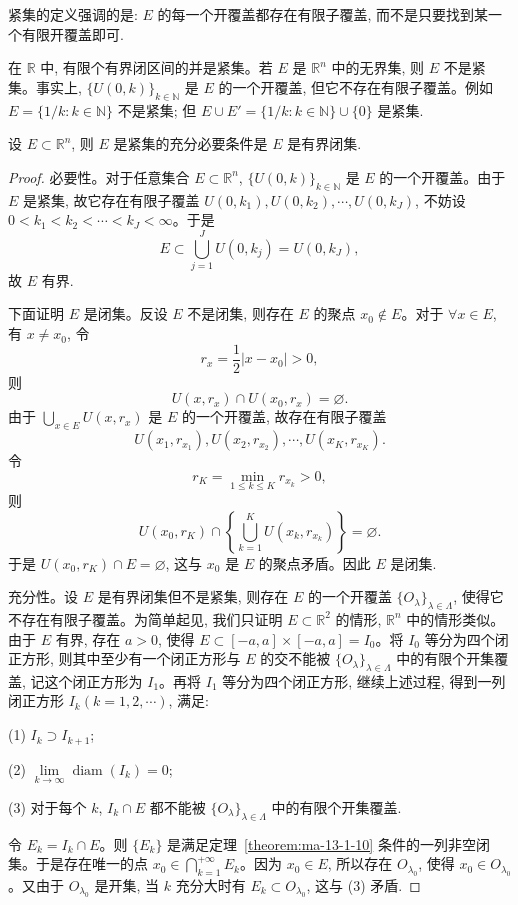 紧集的定义强调的是: $E$ 的每一个开覆盖都存在有限子覆盖, 而不是只要找到某一个有限开覆盖即可.

在 $\mathbb R$ 中, 有限个有界闭区间的并是紧集。若 $E$ 是 $\mathbb R^n$ 中的无界集, 则 $E$ 不是紧集。事实上, $\{U(0,k)\}_{k\in\mathbb N}$ 是 $E$ 的一个开覆盖, 但它不存在有限子覆盖。例如 $E=\{1/k:k\in\mathbb N\}$ 不是紧集; 但 $E\cup E'=\{1/k:k\in\mathbb N\}\cup\{0\}$ 是紧集.

\begin{theorem}\label{theorem:ma-13-1-13}
设 $E\subset\mathbb R^n$, 则 $E$ 是紧集的充分必要条件是 $E$ 是有界闭集.
\end{theorem}


\begin{proof}
必要性。对于任意集合 $E\subset\mathbb R^n$, $\{U(0,k)\}_{k\in\mathbb N}$ 是 $E$ 的一个开覆盖。由于 $E$ 是紧集, 故它存在有限子覆盖 $U(0,k_1),U(0,k_2),\cdots,U(0,k_J)$, 不妨设 $0<k_1<k_2<\cdots<k_J<\infty$。于是
\[
  E\subset\bigcup_{j=1}^J U(0,k_j)=U(0,k_J),
\]
故 $E$ 有界.

下面证明 $E$ 是闭集。反设 $E$ 不是闭集, 则存在 $E$ 的聚点 $x_0\notin E$。对于 $\forall x\in E$, 有 $x\ne x_0$, 令
\[
  r_x=\frac12|x-x_0|>0,
\]
则
\[
  U(x,r_x)\cap U(x_0,r_x)=\varnothing.
\]
由于 $\bigcup\limits_{x\in E}U(x,r_x)$ 是 $E$ 的一个开覆盖, 故存在有限子覆盖
\[
  U(x_1,r_{x_1}),U(x_2,r_{x_2}),\cdots,U(x_K,r_{x_K}).
\]
令
\[
  r_K=\min_{1\leqslant k\leqslant K}r_{x_k}>0,
\]
则
\[
  U(x_0,r_K)\cap\left\{\bigcup_{k=1}^K U(x_k,r_{x_k})\right\}=\varnothing.
\]
于是 $U(x_0,r_K)\cap E=\varnothing$, 这与 $x_0$ 是 $E$ 的聚点矛盾。因此 $E$ 是闭集.

充分性。设 $E$ 是有界闭集但不是紧集, 则存在 $E$ 的一个开覆盖 $\{O_\lambda\}_{\lambda\in\Lambda}$, 使得它不存在有限子覆盖。为简单起见, 我们只证明 $E\subset\mathbb R^2$ 的情形, $\mathbb R^n$ 中的情形类似。由于 $E$ 有界, 存在 $a>0$, 使得 $E\subset[-a,a]\times[-a,a]=I_0$。将 $I_0$ 等分为四个闭正方形, 则其中至少有一个闭正方形与 $E$ 的交不能被 $\{O_\lambda\}_{\lambda\in\Lambda}$ 中的有限个开集覆盖, 记这个闭正方形为 $I_1$。再将 $I_1$ 等分为四个闭正方形, 继续上述过程, 得到一列闭正方形 $I_k(k=1,2,\cdots)$, 满足:

(1) $I_k\supset I_{k+1}$;

(2) $\lim\limits_{k\to\infty}\operatorname{diam}(I_k)=0$;

(3) 对于每个 $k$, $I_k\cap E$ 都不能被 $\{O_\lambda\}_{\lambda\in\Lambda}$ 中的有限个开集覆盖.

令 $E_k=I_k\cap E$。则 $\{E_k\}$ 是满足定理~\ref{theorem:ma-13-1-10} 条件的一列非空闭集。于是存在唯一的点 $x_0\in\bigcap\limits_{k=1}^{+\infty}E_k$。因为 $x_0\in E$, 所以存在 $O_{\lambda_0}$, 使得 $x_0\in O_{\lambda_0}$。又由于 $O_{\lambda_0}$ 是开集, 当 $k$ 充分大时有 $E_k\subset O_{\lambda_0}$, 这与 (3) 矛盾.
\end{proof}


